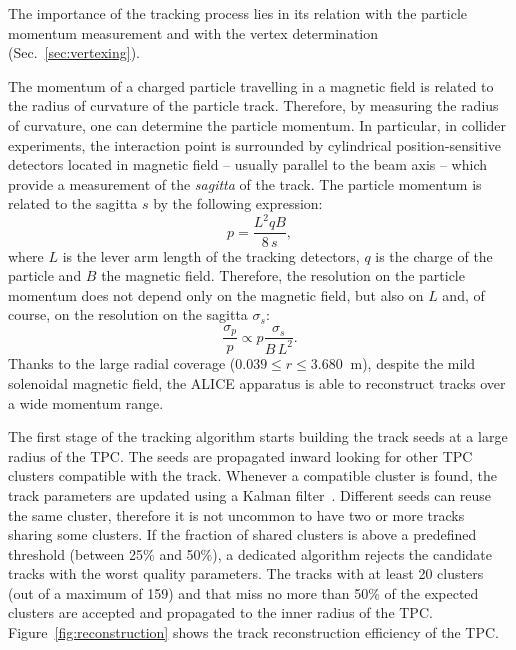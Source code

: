 The importance of the tracking process lies in its relation with the particle momentum
measurement and with the vertex determination (Sec.~\ref{sec:vertexing}).

The momentum of a charged particle travelling in a magnetic field is related to the radius of curvature
of the particle track. Therefore, by measuring the radius of curvature, one can determine the
particle momentum.
In particular, in collider experiments, the interaction point is surrounded by cylindrical 
position-sensitive detectors located in magnetic field -- usually parallel to the beam axis -- 
which provide a measurement of the \textit{sagitta} of the track.
The particle momentum is related to the sagitta $s$ by the following expression:
\begin{equation}
    p = \frac{L^{2} q B}{8\,s},
\end{equation}
where $L$ is the lever arm length of the tracking detectors, $q$ is the charge of the particle and $B$
the magnetic field.
Therefore, the resolution on the particle momentum does not depend only on the magnetic field,
but also on $L$ and, of course, on the resolution on the sagitta $\sigma_{s}$:
\begin{equation}
    \frac{\sigma_{p}}{p} \propto p \frac{\sigma_{s}}{B\,L^{2}}.
\end{equation}
Thanks to the large radial coverage ($0.039 \leq r \leq 3.680\ $ m), despite the mild solenoidal
magnetic field, the ALICE apparatus is able to reconstruct tracks over a wide momentum range.

The first stage of the tracking algorithm starts building the track seeds at a large radius of 
the TPC.
The seeds are propagated inward looking for other TPC clusters compatible with the track.
Whenever a compatible cluster is found, the track parameters are updated using a Kalman 
filter~\cite{kalman}. 
Different seeds can reuse the same cluster, therefore it is not uncommon to have two or more
tracks sharing some clusters. 
If the fraction of shared clusters is above a predefined threshold (between 25\% and 50\%), a
dedicated algorithm rejects the candidate tracks with the worst quality parameters.
The tracks with at least 20 clusters (out of a maximum of 159) and that miss no more than 50\% 
of the expected clusters are accepted and propagated to the inner radius of the TPC.
Figure~\ref{fig:reconstruction} shows the track reconstruction efficiency of the TPC.

